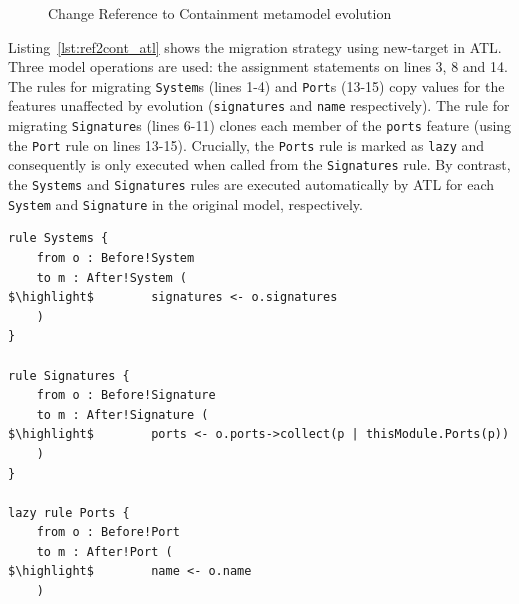 \begin{figure}[htbp]
	\centering
	\caption{Change Reference to Containment metamodel evolution}
\label{fig:ref2cont_mms}
\end{figure}

Listing~\ref{lst:ref2cont_atl} shows the migration strategy using new-target in ATL. Three model operations are used: the assignment statements on lines 3, 8 and 14. The rules for migrating \texttt{System}s (lines 1-4) and \texttt{Port}s (13-15) copy values for the features unaffected by evolution (\texttt{signatures} and \texttt{name} respectively). The rule for migrating \texttt{Signature}s (lines 6-11) clones each member of the \texttt{ports} feature (using the \texttt{Port} rule on lines 13-15). Crucially, the \texttt{Ports} rule is marked as \texttt{lazy} and consequently is only executed when called from the \texttt{Signatures} rule. By contrast, the \texttt{Systems} and \texttt{Signatures} rules are executed automatically by ATL for each \texttt{System} and \texttt{Signature} in the original model, respectively. 

\begin{lstlisting}[float=tbp, caption= Migration for Change Reference to Containment in ATL, label=lst:ref2cont_atl, language=ATL, tabsize=2]
rule Systems {
	from o : Before!System
	to m : After!System (
$\highlight$		signatures <- o.signatures
	)
}

rule Signatures {
	from o : Before!Signature
	to m : After!Signature (
$\highlight$		ports <- o.ports->collect(p | thisModule.Ports(p))
	)
}

lazy rule Ports {
	from o : Before!Port
	to m : After!Port (
$\highlight$		name <- o.name
	)
\end{lstlisting}

